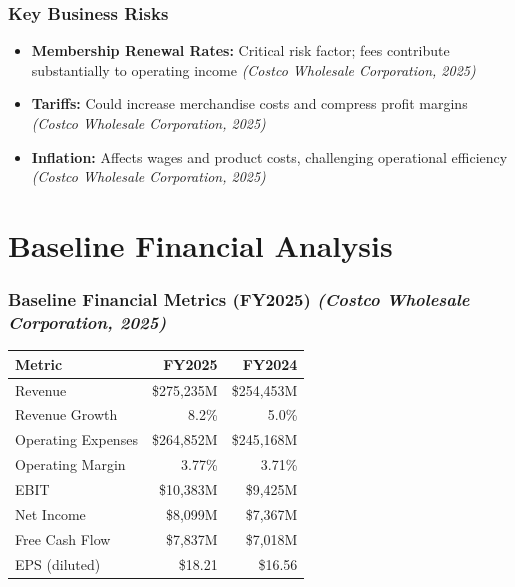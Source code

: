 \documentclass[11pt]{beamer}
\begin{document}
\begin{frame}
\frametitle{Key Business Risks}
\begin{itemize}
  \item \textbf{Membership Renewal Rates:} Critical risk factor; fees contribute substantially to operating income \textit{(Costco Wholesale Corporation, 2025)}
  \item \textbf{Tariffs:} Could increase merchandise costs and compress profit margins \textit{(Costco Wholesale Corporation, 2025)}
  \item \textbf{Inflation:} Affects wages and product costs, challenging operational efficiency \textit{(Costco Wholesale Corporation, 2025)}
\end{itemize}
\end{frame}

\section{Baseline Financial Analysis}
\begin{frame}
\frametitle{Baseline Financial Metrics (FY2025) \textit{(Costco Wholesale Corporation, 2025)}}
\begin{center}
\small
\begin{tabular}{lrr}
\toprule
\textbf{Metric} & \textbf{FY2025} & \textbf{FY2024} \\
\midrule
Revenue & \$275,235M & \$254,453M \\
Revenue Growth & 8.2\% & 5.0\% \\
Operating Expenses & \$264,852M & \$245,168M \\
Operating Margin & 3.77\% & 3.71\% \\
EBIT & \$10,383M & \$9,425M \\
Net Income & \$8,099M & \$7,367M \\
Free Cash Flow & \$7,837M & \$7,018M \\
EPS (diluted) & \$18.21 & \$16.56 \\
\bottomrule
\end{tabular}
\end{center}
\end{frame}
\end{document}
